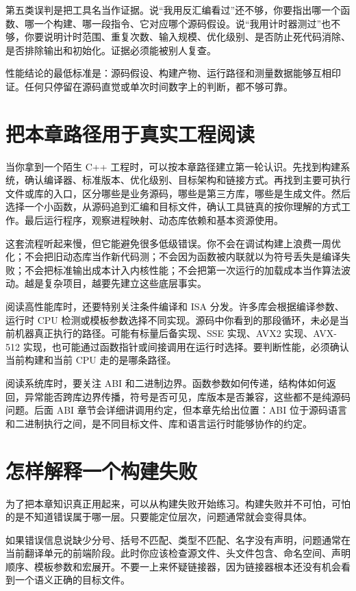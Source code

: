 第五类误判是把工具名当作证据。说“我用反汇编看过”还不够，你要指出哪一个函数、哪一个构建、哪一段指令、它对应哪个源码假设。说“我用计时器测过”也不够，你要说明计时范围、重复次数、输入规模、优化级别、是否防止死代码消除、是否排除输出和初始化。证据必须能被别人复查。

\begin{keyidea}
性能结论的最低标准是：源码假设、构建产物、运行路径和测量数据能够互相印证。任何只停留在源码直觉或单次时间数字上的判断，都不够可靠。
\end{keyidea}

\section{把本章路径用于真实工程阅读}

当你拿到一个陌生 C++ 工程时，可以按本章路径建立第一轮认识。先找到构建系统，确认编译器、标准版本、优化级别、目标架构和链接方式。再找到主要可执行文件或库的入口，区分哪些是业务源码，哪些是第三方库，哪些是生成文件。然后选择一个小函数，从源码追到汇编和目标文件，确认工具链真的按你理解的方式工作。最后运行程序，观察进程映射、动态库依赖和基本资源使用。

这套流程听起来慢，但它能避免很多低级错误。你不会在调试构建上浪费一周优化；不会把旧动态库当作新代码测；不会因为函数被内联就以为符号丢失是编译失败；不会把标准输出成本计入内核性能；不会把第一次运行的加载成本当作算法波动。越是复杂项目，越要先建立这些底层事实。

阅读高性能库时，还要特别关注条件编译和 ISA 分发。许多库会根据编译参数、运行时 CPU 检测或模板参数选择不同实现。源码中你看到的那段循环，未必是当前机器真正执行的路径。可能有标量后备实现、SSE 实现、AVX2 实现、AVX-512 实现，也可能通过函数指针或间接调用在运行时选择。要判断性能，必须确认当前构建和当前 CPU 走的是哪条路径。

阅读系统库时，要关注 ABI 和二进制边界。函数参数如何传递，结构体如何返回，异常能否跨库边界传播，符号是否可见，库版本是否兼容，这些都不是纯源码问题。后面 ABI 章节会详细讲调用约定，但本章先给出位置：ABI 位于源码语言和二进制执行之间，是不同目标文件、库和语言运行时能够协作的约定。

\section{怎样解释一个构建失败}

为了把本章知识真正用起来，可以从构建失败开始练习。构建失败并不可怕，可怕的是不知道错误属于哪一层。只要能定位层次，问题通常就会变得具体。

如果错误信息说缺少分号、括号不匹配、类型不匹配、名字没有声明，问题通常在当前翻译单元的前端阶段。此时你应该检查源文件、头文件包含、命名空间、声明顺序、模板参数和宏展开。不要一上来怀疑链接器，因为链接器根本还没有机会看到一个语义正确的目标文件。

